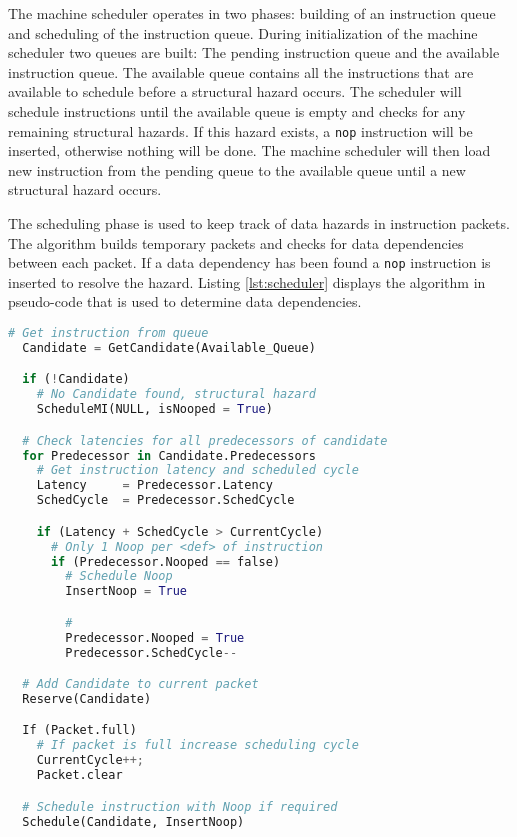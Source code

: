 The machine scheduler operates in two phases: building of an instruction queue and scheduling of the instruction queue.
During initialization of the machine scheduler two queues are built: The pending instruction queue and the available instruction queue. The available queue contains all the instructions that are available to schedule before a structural hazard occurs. The scheduler will schedule instructions until the available queue is empty and checks for any remaining structural hazards. If this hazard exists, a \texttt{nop} instruction will be inserted, otherwise nothing will be done. The machine scheduler will then load new instruction from the pending queue to the available queue until a new structural hazard occurs.

The scheduling phase is used to keep track of data hazards in instruction packets. The algorithm builds temporary packets and checks for data dependencies between each packet. If a data dependency has been found a \texttt{nop} instruction is inserted to resolve the hazard. Listing \ref{lst:scheduler} displays the algorithm in pseudo-code that is used to determine data dependencies. 


\begin{lstlisting}[language=python,label=lst:scheduler]
  # Get instruction from queue
  Candidate = GetCandidate(Available_Queue)

  if (!Candidate)
    # No Candidate found, structural hazard
    ScheduleMI(NULL, isNooped = True)

  # Check latencies for all predecessors of candidate
  for Predecessor in Candidate.Predecessors
    # Get instruction latency and scheduled cycle
    Latency     = Predecessor.Latency
    SchedCycle  = Predecessor.SchedCycle   

    if (Latency + SchedCycle > CurrentCycle)
      # Only 1 Noop per <def> of instruction
      if (Predecessor.Nooped == false)
        # Schedule Noop
        InsertNoop = True

        #                   
        Predecessor.Nooped = True
        Predecessor.SchedCycle--          

  # Add Candidate to current packet
  Reserve(Candidate)                       

  If (Packet.full)
    # If packet is full increase scheduling cycle
    CurrentCycle++;                        
    Packet.clear                           

  # Schedule instruction with Noop if required     
  Schedule(Candidate, InsertNoop)           

\end{lstlisting}

